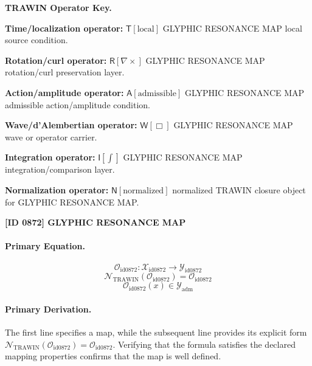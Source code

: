 \par\vspace{0.45\baselineskip}
\noindent\begin{minipage}[t]{\linewidth}
\begingroup
\small
\raggedright
\textbf{TRAWIN Operator Key.}\par
\noindent\textbf{Time/localization operator:} $\mathsf{T}\!\left[\mathrm{local}\right]$ GLYPHIC RESONANCE MAP local source condition.\par
\noindent\textbf{Rotation/curl operator:} $\mathsf{R}\!\left[\nabla\times\right]$ GLYPHIC RESONANCE MAP rotation/curl preservation layer.\par
\noindent\textbf{Action/amplitude operator:} $\mathsf{A}\!\left[\mathrm{admissible}\right]$ GLYPHIC RESONANCE MAP admissible action/amplitude condition.\par
\noindent\textbf{Wave/d'Alembertian operator:} $\mathsf{W}\!\left[\Box\right]$ GLYPHIC RESONANCE MAP wave or operator carrier.\par
\noindent\textbf{Integration operator:} $\mathsf{I}\!\left[\int\right]$ GLYPHIC RESONANCE MAP integration/comparison layer.\par
\noindent\textbf{Normalization operator:} $\mathsf{N}\!\left[\mathrm{normalized}\right]$ normalized TRAWIN closure object for GLYPHIC RESONANCE MAP.\par
\endgroup
\end{minipage}

\clearpage
\noindent\textbf{[ID 0872] GLYPHIC RESONANCE MAP}\par
\vspace{0.35em}
\paragraph{Primary Equation.}
\[
\mathcal{O}_{\mathrm{id0872}}:\mathcal{X}_{\mathrm{id0872}}\longrightarrow\mathcal{Y}_{\mathrm{id0872}}
\]
\[
\mathcal{N}_{\mathrm{TRAWIN}}(\mathcal{O}_{\mathrm{id0872}})=\mathcal{O}_{\mathrm{id0872}}
\]
\[
\mathcal{O}_{\mathrm{id0872}}(x)\in\mathcal{Y}_{\mathrm{adm}}
\]

\paragraph{Primary Derivation.}
The first line specifies a map, while the subsequent line provides its explicit form \( \mathcal{N}_{\mathrm{TRAWIN}}(\mathcal{O}_{\mathrm{id0872}})=\mathcal{O}_{\mathrm{id0872}} \). Verifying that the formula satisfies the declared mapping properties confirms that the map is well defined.
